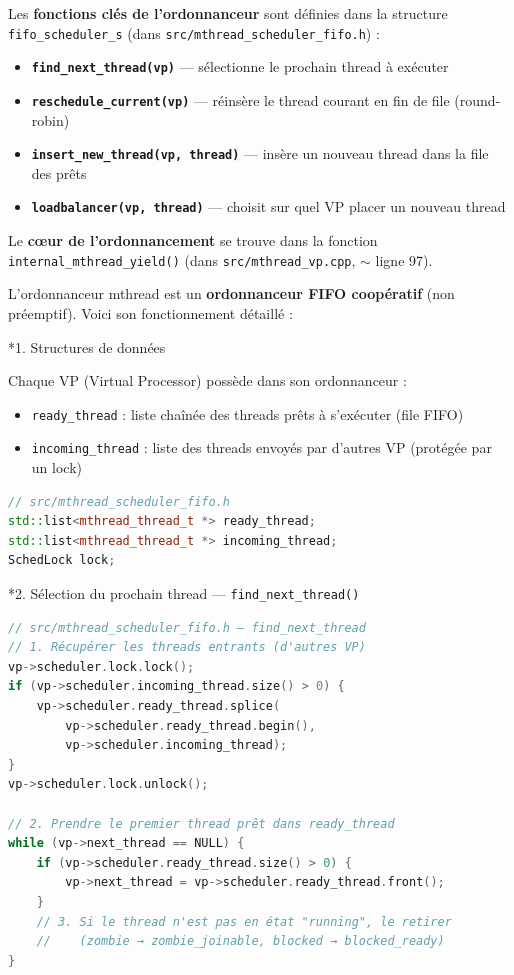 \documentclass[11pt,a4paper]{article}
\newcommand{\question}[1]{%
  \bigskip\noindent{\large\bfseries\color{questioncolor}#1}\par\medskip}
\let\oldtexttt\texttt
\renewcommand{\texttt}[1]{\oldtexttt{\color{keyword}#1}}
\begin{document}
Les \textbf{fonctions clés de l'ordonnanceur} sont définies dans la structure \texttt{fifo\_scheduler\_s} (dans \texttt{src/mthread\_scheduler\_fifo.h}) :

\begin{itemize}
  \item \textbf{\texttt{find\_next\_thread(vp)}} — sélectionne le prochain thread à exécuter
  \item \textbf{\texttt{reschedule\_current(vp)}} — réinsère le thread courant en fin de file (round-robin)
  \item \textbf{\texttt{insert\_new\_thread(vp, thread)}} — insère un nouveau thread dans la file des prêts
  \item \textbf{\texttt{loadbalancer(vp, thread)}} — choisit sur quel VP placer un nouveau thread
\end{itemize}

Le \textbf{cœur de l'ordonnancement} se trouve dans la fonction \texttt{internal\_mthread\_yield()} (dans \texttt{src/mthread\_vp.cpp}, \(\sim\) ligne 97).

\question{Q.11 : Fonctionnement de l'ordonnanceur}

L'ordonnanceur mthread est un \textbf{ordonnanceur FIFO coopératif} (non préemptif). Voici son fonctionnement détaillé :

*{1. Structures de données}

Chaque VP (Virtual Processor) possède dans son ordonnanceur :
\begin{itemize}
  \item \texttt{ready\_thread} : liste chaînée des threads prêts à s'exécuter (file FIFO)
  \item \texttt{incoming\_thread} : liste des threads envoyés par d'autres VP (protégée par un lock)
\end{itemize}

\begin{lstlisting}[language=C++]
// src/mthread_scheduler_fifo.h
std::list<mthread_thread_t *> ready_thread;
std::list<mthread_thread_t *> incoming_thread;
SchedLock lock;
\end{lstlisting}

*{2. Sélection du prochain thread — \texttt{find\_next\_thread()}}

\begin{lstlisting}[language=C++]
// src/mthread_scheduler_fifo.h — find_next_thread
// 1. Récupérer les threads entrants (d'autres VP)
vp->scheduler.lock.lock();
if (vp->scheduler.incoming_thread.size() > 0) {
    vp->scheduler.ready_thread.splice(
        vp->scheduler.ready_thread.begin(),
        vp->scheduler.incoming_thread);
}
vp->scheduler.lock.unlock();

// 2. Prendre le premier thread prêt dans ready_thread
while (vp->next_thread == NULL) {
    if (vp->scheduler.ready_thread.size() > 0) {
        vp->next_thread = vp->scheduler.ready_thread.front();
    }
    // 3. Si le thread n'est pas en état "running", le retirer
    //    (zombie → zombie_joinable, blocked → blocked_ready)
}
\end{lstlisting}
\end{document}
